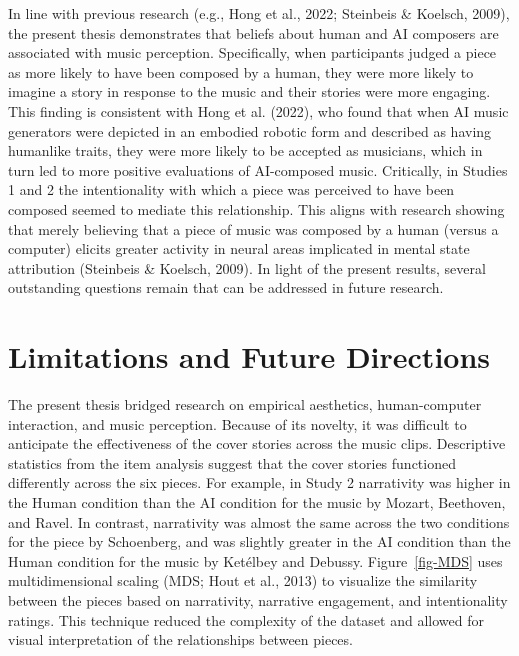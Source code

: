 \documentclass[12pt,twoside]{reedthesis}
\begin{document}
In line with previous research (e.g., Hong et al., 2022; Steinbeis \& Koelsch, 2009), the present thesis demonstrates that beliefs about human and AI composers are associated with music perception. Specifically, when participants judged a piece as more likely to have been composed by a human, they were more likely to imagine a story in response to the music and their stories were more engaging. This finding is consistent with Hong et al. (2022), who found that when AI music generators were depicted in an embodied robotic form and described as having humanlike traits, they were more likely to be accepted as musicians, which in turn led to more positive evaluations of AI-composed music. Critically, in Studies 1 and 2 the intentionality with which a piece was perceived to have been composed seemed to mediate this relationship. This aligns with research showing that merely believing that a piece of music was composed by a human (versus a computer) elicits greater activity in neural areas implicated in mental state attribution (Steinbeis \& Koelsch, 2009). In light of the present results, several outstanding questions remain that can be addressed in future research. 



\section*{Limitations and Future Directions}

The present thesis bridged research on empirical aesthetics, human-computer interaction, and music perception. Because of its novelty, it was difficult to anticipate the effectiveness of the cover stories across the music clips. Descriptive statistics from the item analysis suggest that the cover stories functioned differently across the six pieces. For example, in Study 2 narrativity was higher in the Human condition than the AI condition for the music by Mozart, Beethoven, and Ravel. In contrast, narrativity was almost the same across the two conditions for the piece by Schoenberg, and was slightly greater in the AI condition than the Human condition for the music by Ketélbey and Debussy. Figure~\ref*{fig-MDS} uses multidimensional scaling (MDS; Hout et al., 2013) to visualize the similarity between the pieces based on narrativity, narrative engagement, and intentionality ratings. This technique reduced the complexity of the dataset and allowed for visual interpretation of the relationships between pieces.  
\end{document}
